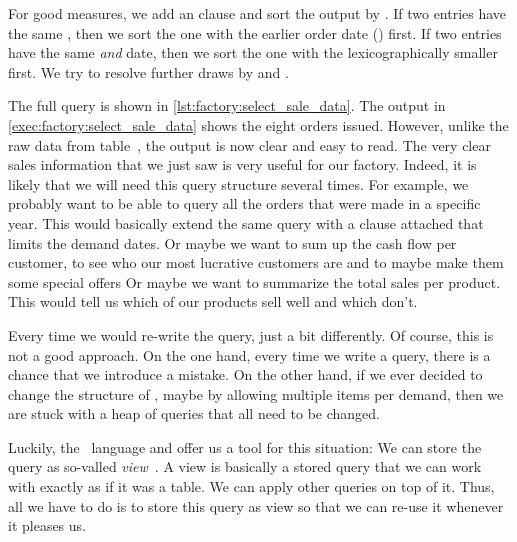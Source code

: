 For good measures, we add an  clause and sort the output by .
If two entries have the same , then we sort the one with the earlier order date () first.
If two entries have the same  \emph{and}  date, then we sort the one with the lexicographically smaller  first.
We try to resolve further draws by  and .

The full query is shown in \cref{lst:factory:select_sale_data}.
The output in \cref{exec:factory:select_sale_data} shows the eight orders issued.
However, unlike the raw data from table~, the output is now clear and easy to read.%
%
\FloatBarrier%
\endhsection%
%
\endhsection%
%
%
%
%
%
%
The very clear sales information that we just saw is very useful for our factory.
Indeed, it is likely that we will need this query structure several times.
For example, we probably want to be able to query all the orders that were made in a specific year.
This would basically extend the same query with a  clause attached that limits the demand dates.
Or maybe we want to sum up the cash flow per customer, to see who our most lucrative customers are and to maybe make them some special offers
Or maybe we want to summarize the total sales per product.
This would tell us which of our products sell well and which don't.

Every time we would re-write the query, just a bit differently.
Of course, this is not a good approach.
On the one hand, every time we write a query, there is a chance that we introduce a mistake.
On the other hand, if we ever decided to change the structure of \db, maybe by allowing multiple items per demand, then we are stuck with a heap of queries that all need to be changed.

Luckily, the \sql\ language and  offer us a tool for this situation:
We can store the query as so-valled \emph{view}~\cite{PGDG:PD:CV}.
A view is basically a stored query that we can work with exactly as if it was a table.
We can apply other  queries on top of it.
Thus, all we have to do is to store this query as view so that we can re-use it whenever it pleases us.

